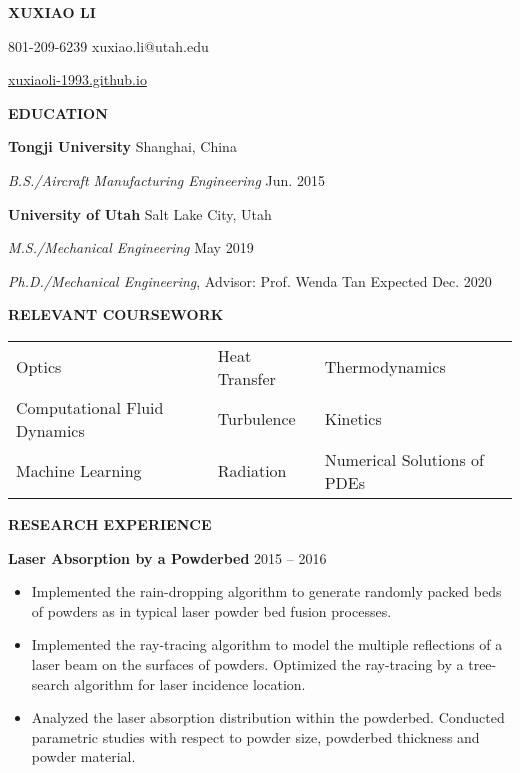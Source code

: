 \documentclass[12pt, letterpaper]{article}
\begin{document}
\begin{center}
   \textbf{\large XUXIAO LI}

   801-209-6239 \textbar{} xuxiao.li@utah.edu

   \href{xuxiaoli-1993.github.io}{xuxiaoli-1993.github.io}
   \paraspace
\end{center}

\textbf{EDUCATION}

\fullrule

\textbf{Tongji University} 
\hfill
Shanghai, China

\textit{B.S./Aircraft Manufacturing Engineering} \hfill Jun. 2015

\vspace{6pt}
\textbf{University of Utah} \hfill Salt Lake City, Utah

\textit{M.S./Mechanical Engineering} \hfill May 2019

\textit{Ph.D./Mechanical Engineering}, Advisor: Prof. Wenda Tan \hfill Expected Dec. 2020 
\vskip 11pt

\textbf{RELEVANT COURSEWORK}

\fullrule
\vspace{3pt}
\begin{tabular}{@{} p{} p{} p{} @{}}
   Optics & Heat Transfer & Thermodynamics \\
   Computational Fluid Dynamics & Turbulence & Kinetics \\
   Machine Learning & Radiation & Numerical Solutions of PDEs
\end{tabular}
\vspace{9pt}

\textbf{RESEARCH EXPERIENCE}

\fullrule
\textbf{Laser Absorption by a Powderbed} \hfill 2015 -- 2016
\begin{itemize}[leftmargin=*, labelsep=5mm]
   \item Implemented the rain-dropping algorithm to generate randomly packed beds of powders as in
      typical laser powder bed fusion processes.
   \item Implemented the ray-tracing algorithm to model the multiple reflections of a laser beam on
      the surfaces of powders. Optimized the ray-tracing by a tree-search algorithm for laser
      incidence location.
   \item Analyzed the laser absorption distribution within the powderbed. Conducted parametric
      studies with respect to powder size, powderbed thickness and powder material.
\end{itemize}
\end{document}
